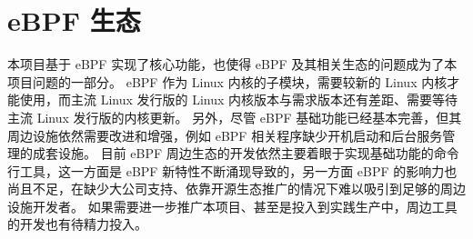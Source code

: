 \section{eBPF 生态}

本项目基于 eBPF 实现了核心功能，也使得 eBPF 及其相关生态的问题成为了本项目问题的一部分。
eBPF 作为 Linux 内核的子模块，需要较新的 Linux 内核才能使用，而主流 Linux 发行版的 Linux 内核版本与需求版本还有差距、需要等待主流 Linux 发行版的内核更新。
另外，尽管 eBPF 基础功能已经基本完善，但其周边设施依然需要改进和增强，例如 eBPF 相关程序缺少开机启动和后台服务管理的成套设施。
目前 eBPF 周边生态的开发依然主要着眼于实现基础功能的命令行工具，这一方面是 eBPF 新特性不断涌现导致的，另一方面 eBPF 的影响力也尚且不足，在缺少大公司支持、依靠开源生态推广的情况下难以吸引到足够的周边设施开发者。
如果需要进一步推广本项目、甚至是投入到实践生产中，周边工具的开发也有待精力投入。
